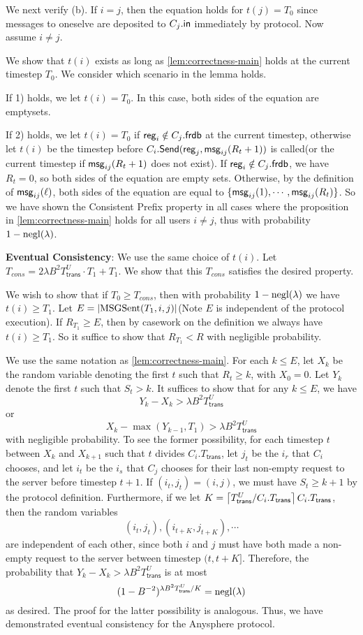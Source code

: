  We next verify (b). If $i = j$, then the equation holds for $t(j) = T_0$ since messages to oneselve are deposited to $C_j.\mathsf{in}$ immediately by protocol. Now assume $i \neq j.$ 
 
 We show that $t(i)$ exists as long as \cref{lem:correctness-main} holds at the current timestep $T_0$. We consider which scenario in the lemma holds. 
 
 If 1) holds, we let $t(i) = T_0$. In this case, both sides of the equation are emptysets.
 
 If 2) holds, we let $t(i) = T_0$ if $\mathsf{reg}_i \notin C_j.\mathsf{frdb}$ at the current timestep, otherwise let $t(i)$ be the timestep before $C_i.\mathsf{Send}(\mathsf{reg}_j, \mathsf{msg}_{ij}(R_{t} + 1))$ is called(or the current timestep if $\mathsf{msg}_{ij}(R_{t} + 1)$ does not exist). If $\mathsf{reg}_i \notin C_j.\mathsf{frdb}$, we have $R_t = 0$, so both sides of the equation are empty sets. Otherwise, by the definition of $\mathsf{msg}_{ij}(\ell)$, both sides of the equation are equal to $\{\mathsf{msg}_{ij}(1),\cdots, \mathsf{msg}_{ij}(R_t)\}$. So we have shown the Consistent Prefix property in all cases where the proposition in \cref{lem:correctness-main} holds for all users $i \neq j$, thus with probability $1 - \operatorname{negl}(\lambda)$.
 
 \textbf{Eventual Consistency}: We use the same choice of $t(i)$. Let $T_{cons} = 2\lambda B^2 T^U_{\mathsf{trans}} \cdot T_1 + T_1.$ We show that this $T_{cons}$ satisfies the desired property. 
 
 We wish to show that if $T_0 \geq T_{cons}$, then with probability $1 - \operatorname{negl}(\lambda)$ we have $t(i) \geq T_1$. Let $E = \left| \text{MSGSent}(T_1, i, j) \right|$(Note $E$ is independent of the protocol execution). If $R_{T_1} \geq E$, then by casework on the definition we always have $t(i) \geq T_1$. So it suffice to show that $R_{T_1} < R$ with negligible probability. 
 
 We use the same notation as \cref{lem:correctness-main}. For each $k \leq E$, let $X_k$ be the random variable denoting the first $t$ such that $R_t \geq k$, with $X_0 = 0$. Let $Y_k$ denote the first $t$ such that $S_{t} > k$. It suffices to show that for any $k \leq E$, we have
 $$Y_k - X_k > \lambda B^2 T^U_{\mathsf{trans}}$$
 or
 $$X_{k} - \max(Y_{k - 1}, T_1) > \lambda B^2 T^U_{\mathsf{trans}}$$
 with negligible probability. To see the former possibility, for each timestep $t$ between $X_k$ and $X_{k + 1}$ such that $t$ divides $C_i.T_{\mathsf{trans}}$, let $j_t$ be the $i_r$ that $C_i$ chooses, and let $i_t$ be the $i_s$ that $C_j$ chooses for their last non-empty request to the server before timestep $t + 1$. If $(i_t, j_t) = (i, j)$, we must have $S_{t} \geq k + 1$ by the protocol definition. Furthermore, if we let $K = \left\lceil T^U_{\mathsf{trans}} / C_i.T_{\mathsf{trans}} \right\rceil C_i.T_{\mathsf{trans}}$, then the random variables
 $$(i_t, j_t), (i_{t + K}, j_{t + K}), \cdots$$
are independent of each other, since both $i$ and $j$ must have both made a non-empty request to the server between timestep $(t, t + K]$. Therefore, the probability that $Y_k - X_k > \lambda B^2 T^U_{\mathsf{trans}}$ is at most
$$(1 - B^{-2})^{\lambda B^2 T^U_{\mathsf{trans}} / K} = \operatorname{negl}(\lambda)$$
as desired. The proof for the latter possibility is analogous. Thus, we have demonstrated eventual consistency for the Anysphere protocol.
